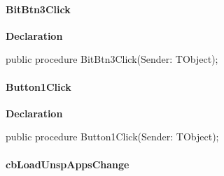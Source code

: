 \documentclass{report}
\newif\ifpdf
\begin{document}
\paragraph*{BitBtn3Click}\hspace*{\fill}

\label{settings.TFmConfig-BitBtn3Click}
\begin{list}{}{
\setlength{\itemindent}{0cm}
\setlength{\listparindent}{0cm}
\setlength{\leftmargin}{\evensidemargin}
\addtolength{\leftmargin}{\tmplength}
\settowidth{\labelsep}{X}
\addtolength{\leftmargin}{\labelsep}
\setlength{\labelwidth}{\tmplength}
}
\item[\textbf{Declaration}\hfill]
\ifpdf
\begin{flushleft}
\fi
\begin{ttfamily}
public procedure BitBtn3Click(Sender: TObject);\end{ttfamily}

\ifpdf
\end{flushleft}
\fi

\end{list}
\paragraph*{Button1Click}\hspace*{\fill}

\label{settings.TFmConfig-Button1Click}
\begin{list}{}{
\setlength{\itemindent}{0cm}
\setlength{\listparindent}{0cm}
\setlength{\leftmargin}{\evensidemargin}
\addtolength{\leftmargin}{\tmplength}
\settowidth{\labelsep}{X}
\addtolength{\leftmargin}{\labelsep}
\setlength{\labelwidth}{\tmplength}
}
\item[\textbf{Declaration}\hfill]
\ifpdf
\begin{flushleft}
\fi
\begin{ttfamily}
public procedure Button1Click(Sender: TObject);\end{ttfamily}

\ifpdf
\end{flushleft}
\fi

\end{list}
\paragraph*{cbLoadUnspAppsChange}\hspace*{\fill}
\end{document}
